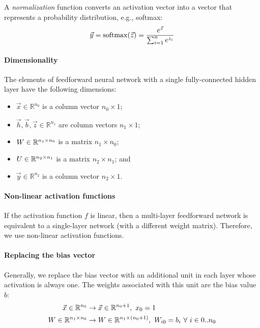 A \textit{normalization} function converts an activation vector into a vector
that represents a probability distribution, e.g., softmax:
\begin{equation}
  \vec{y} = \operatorname{softmax}(\vec{z}) = \frac{e^{\vec{z}}}{\sum_{i = 1}^{n} e^{z_i}}
\end{equation}

\paragraph{Dimensionality}

The elements of feedforward neural network with a single fully-connected hidden
layer have the following dimensions:
\begin{itemize}
  \item $\vec{x} \in \mathbb{R}^{n_0}$ is a column vector $n_0 \times 1$;
  \item $\vec{h}, \vec{b}, \vec{z} \in \mathbb{R}^{n_1}$ are column vectors $n_1 \times 1$;
  \item $W \in \mathbb{R}^{n_1 \times n_0}$ is a matrix $n_1 \times n_0$;
  \item $U \in \mathbb{R}^{n_2 \times n_1}$ is a matrix $n_2 \times n_1$; and
  \item $\vec{y} \in \mathbb{R}^{n_2}$ is a column vector $n_2 \times 1$.
\end{itemize}

\paragraph{Non-linear activation functions}

If the activation function $f$ is linear, then a multi-layer feedforward network
is equivalent to a single-layer network (with a different weight matrix).
Therefore, we use non-linear activation functions.

\paragraph{Replacing the bias vector}

Generally, we replace the bias vector with an additional unit in each layer
whose activation is always one.
The weights associated with this unit are the bias value $b$:
\begin{align*}
  \vec{x} \in \mathbb{R}^{n_0}
   & \rightarrow \vec{x} \in \mathbb{R}^{n_0 + 1},\
  x_0 = 1                                                         \\
  W \in \mathbb{R}^{n_1 \times n_0}
   & \rightarrow W \in \mathbb{R}^{n_1 \times (n_0 + 1)},\
  W_{i0} = b_i \ \forall\ i \in 0 .. n_0                          \\
\end{align*}

